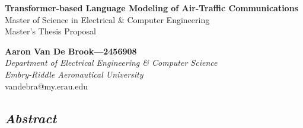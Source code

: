 \documentclass[10pt]{article}
\begin{document}
    \begin{center}
        \LARGE
        \textbf{Transformer-based Language Modeling of Air-Traffic Communications}\\
        \Large
        Master of Science in Electrical \& Computer Engineering\\
        Master's Thesis Proposal\\

        \vspace*{0.25in}

        \normalsize
        \textbf{Aaron Van De Brook---2456908}\\
        \textit{Department of Electrical Engineering \& Computer Science}\\
        \textit{Embry-Riddle Aeronautical University}\\
        vandebra@my.erau.edu
    \end{center}

    \begin{center}
        \section*{\textit{Abstract}}
        \noindent
        \justifying
        \textit{
            \lipsum[1]
        }
    \end{center}

\end{document}
